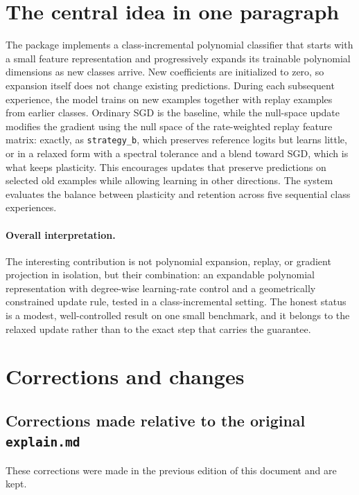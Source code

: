 \documentclass[11pt,a4paper]{article}
\newcommand{\code}[1]{\texttt{#1}}
\begin{document}
\section{The central idea in one paragraph}

The package implements a class-incremental polynomial classifier that starts with a small feature representation and progressively expands its trainable polynomial dimensions as new classes arrive. New coefficients are initialized to zero, so expansion itself does not change existing predictions. During each subsequent experience, the model trains on new examples together with replay examples from earlier classes. Ordinary SGD is the baseline, while the null-space update modifies the gradient using the null space of the rate-weighted replay feature matrix: exactly, as \code{strategy\_b}, which preserves reference logits but learns little, or in a relaxed form with a spectral tolerance and a blend toward SGD, which is what keeps plasticity. This encourages updates that preserve predictions on selected old examples while allowing learning in other directions. The system evaluates the balance between plasticity and retention across five sequential class experiences.

\paragraph{Overall interpretation.} The interesting contribution is not polynomial expansion, replay, or gradient projection in isolation, but their combination: an expandable polynomial representation with degree-wise learning-rate control and a geometrically constrained update rule, tested in a class-incremental setting. The honest status is a modest, well-controlled result on one small benchmark, and it belongs to the relaxed update rather than to the exact step that carries the guarantee.

\appendix
\section{Corrections and changes}\label{app:corrections}

\subsection{Corrections made relative to the original \texttt{explain.md}}

These corrections were made in the previous edition of this document and are kept.
\end{document}
